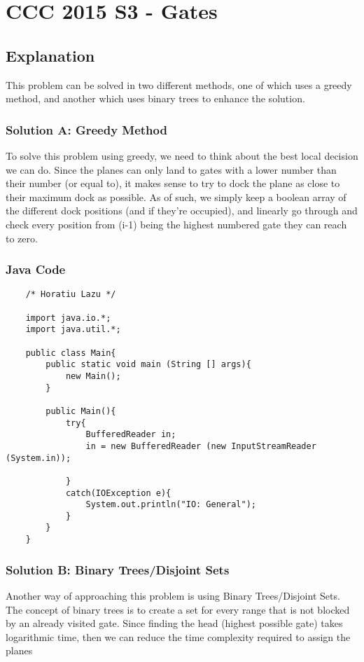 \documentclass[52pt]{article}
\begin{document}
	\section {CCC 2015 S3 - Gates}
	\subsection {Explanation}
	This problem can be solved in two different methods, one of which uses a greedy method, and another which uses binary trees to enhance the solution.
	\subsubsection{Solution A: Greedy Method}
	To solve this problem using greedy, we need to think about the best local decision we can do. Since the planes can only land to gates with a lower number than their number (or equal to), it makes sense to try to dock the plane as close to their maximum dock as possible. As of such, we simply keep a boolean array of the different dock positions (and if they're occupied), and linearly go through and check every position from (i-1) being the highest numbered gate they can reach to zero. 
	
	\subsubsection {Java Code}
	\begin{lstlisting}
	/* Horatiu Lazu */

	import java.io.*;
	import java.util.*;

	public class Main{
		public static void main (String [] args){
			new Main();
		}
		
		public Main(){
			try{
				BufferedReader in;
				in = new BufferedReader (new InputStreamReader (System.in));
				
			}
			catch(IOException e){
				System.out.println("IO: General");
			}
		}
	}
	\end{lstlisting}
	
	\subsubsection{Solution B: Binary Trees/Disjoint Sets}
	Another way of approaching this problem is using Binary Trees/Disjoint Sets. The concept of binary trees is to create a set for every range that is not blocked by an already visited gate. Since finding the head (highest possible gate) takes logarithmic time, then we can reduce the time complexity required to assign the planes
	
\end{document}

